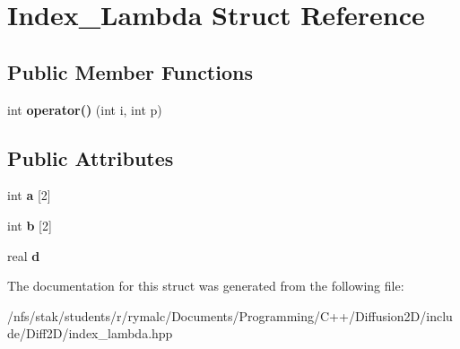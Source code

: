 \hypertarget{structIndex__Lambda}{\section{Index\+\_\+\+Lambda Struct Reference}
\label{structIndex__Lambda}
}
\subsection*{Public Member Functions}
\begin{DoxyCompactItemize}
\item 
\hypertarget{structIndex__Lambda_af8225252f38290763a8aae14a0660a02}{int {\bfseries operator()} (int i, int p)}\label{structIndex__Lambda_af8225252f38290763a8aae14a0660a02}

\end{DoxyCompactItemize}
\subsection*{Public Attributes}
\begin{DoxyCompactItemize}
\item 
\hypertarget{structIndex__Lambda_acdf68b7c6f870f4eeb4ee9d8183e0c73}{int {\bfseries a} \mbox{[}2\mbox{]}}\label{structIndex__Lambda_acdf68b7c6f870f4eeb4ee9d8183e0c73}

\item 
\hypertarget{structIndex__Lambda_aaa095d0d1b30bc698d5a816ff0199951}{int {\bfseries b} \mbox{[}2\mbox{]}}\label{structIndex__Lambda_aaa095d0d1b30bc698d5a816ff0199951}

\item 
\hypertarget{structIndex__Lambda_a34e9306034a5059d37f4ab53d79ea5c7}{real {\bfseries d}}\label{structIndex__Lambda_a34e9306034a5059d37f4ab53d79ea5c7}

\end{DoxyCompactItemize}


The documentation for this struct was generated from the following file\+:\begin{DoxyCompactItemize}
\item 
/nfs/stak/students/r/rymalc/\+Documents/\+Programming/\+C++/\+Diffusion2\+D/include/\+Diff2\+D/index\+\_\+lambda.\+hpp\end{DoxyCompactItemize}
